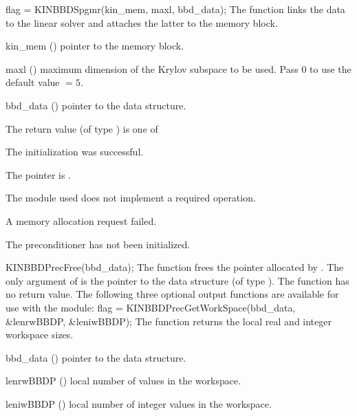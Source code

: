 {
  flag = KINBBDSpgmr(kin\_mem, maxl, bbd\_data);
}
{
  The function  links the {\kinbbdpre} data to the
  {\kinspgmr} linear solver and attaches the latter to the {\kinsol}
  memory block.
}
{
  \begin{args}
  \item[kin\_mem] ()
    pointer to the {\kinsol} memory block.
  \item[maxl] ()
    maximum dimension of the Krylov subspace to be used. Pass $0$ to use the 
    default value $=5$.
  \item[bbd\_data] ()
    pointer to the {\kinbbdpre} data structure.
  \end{args}
}
{
  The return value  (of type ) is one of
  \begin{args}
  \item[\Id{KINSPGMR\_SUCCESS}] 
    The {\kinspgmr} initialization was successful.
  \item[\Id{KINSPGMR\_MEM\_NULL}]
    The  pointer is .
  \item[\Id{KINSPGMR\_ILL\_INPUT}]
    The {\nvector} module used does not implement a required operation.
  \item[\Id{KINSPGMR\_MEM\_FAIL}]
    A memory allocation request failed.
  \item[\Id{KIN\_PDATA\_NULL}]
    The {\kinbbdpre} preconditioner has not been initialized.
  \end{args}
}
{}
{
  KINBBDPrecFree(bbd\_data);
}
{
  The function  frees the pointer allocated by
  .
}
{
  The only argument of  is the pointer to the {\kinbbdpre} 
  data structure (of type ).
}
{
  The function  has no return value.
}
{}
The following three optional output functions are available for use with
the {\kinbbdpre} module:
{
  flag = KINBBDPrecGetWorkSpace(bbd\_data, \&lenrwBBDP, \&leniwBBDP);
}
{
  The function  returns the local
  {\kinbbdpre} real and integer workspace sizes.
}
{
  \begin{args}[lenrwBBDP]
  \item[bbd\_data] ()
    pointer to the {\kinbbdpre} data structure.
  \item[lenrwBBDP] ()
    local number of  values in the {\kinbbdpre} workspace.
  \item[leniwBBDP] ()
    local number of integer values in the {\kinbbdpre} workspace.
  \end{args}
}
